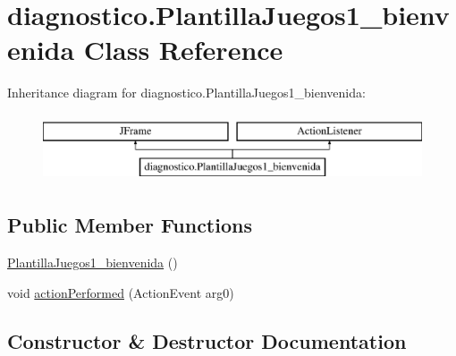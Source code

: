 \hypertarget{classdiagnostico_1_1_plantilla_juegos1__bienvenida}{}\section{diagnostico.\+Plantilla\+Juegos1\+\_\+bienvenida Class Reference}
\label{classdiagnostico_1_1_plantilla_juegos1__bienvenida}
Inheritance diagram for diagnostico.\+Plantilla\+Juegos1\+\_\+bienvenida\+:\begin{figure}[H]
\begin{center}
\leavevmode
\includegraphics[height=2.000000cm]{classdiagnostico_1_1_plantilla_juegos1__bienvenida}
\end{center}
\end{figure}
\subsection*{Public Member Functions}
\begin{DoxyCompactItemize}
\item 
\mbox{\hyperlink{classdiagnostico_1_1_plantilla_juegos1__bienvenida_a6f4a6efbccc56039a84d6b885b9fdb18}{Plantilla\+Juegos1\+\_\+bienvenida}} ()
\item 
void \mbox{\hyperlink{classdiagnostico_1_1_plantilla_juegos1__bienvenida_a6a545808a078575c0891eb9e7a79169c}{action\+Performed}} (Action\+Event arg0)
\end{DoxyCompactItemize}


\subsection{Constructor \& Destructor Documentation}
\mbox{\label{classdiagnostico_1_1_plantilla_juegos1__bienvenida_a6f4a6efbccc56039a84d6b885b9fdb18}} 
